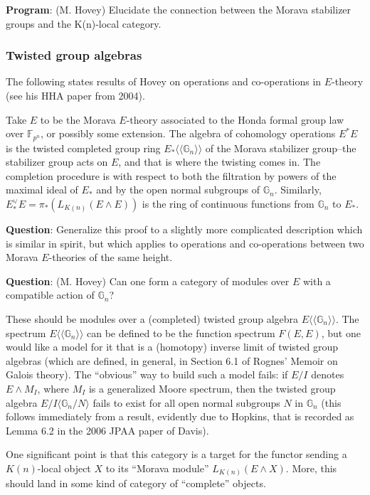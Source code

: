 \documentclass[12pt,titlepage]{article}
\theoremstyle{plain}
\theoremstyle{definition}
\theoremstyle{remark}
\begin{document}
\textbf{Program}: (M. Hovey) Elucidate the connection between the Morava stabilizer groups and the K(n)-local category.

\hypertarget{twisted_group_algebras_3}{}\subsubsection{{Twisted group algebras}}\label{twisted_group_algebras_3}

The following states results of Hovey on operations and co-operations in $E$-theory (see his HHA paper from 2004).

Take $E$ to be the Morava $E$-theory associated to the Honda formal group law over $\mathbb{F}_{p^n}$, or possibly some extension. The algebra of cohomology operations $E^*E$ is the twisted completed group ring $E_*\langle\!\langle \mathbb{G}_n\rangle\!\rangle$ of the Morava stabilizer group--{}the stabilizer group acts on $E$, and that is where the twisting comes in. The completion procedure is with respect to both the filtration by powers of the maximal ideal of $E_*$ and by the open normal subgroups of $\mathbb{G}_n$. Similarly, $E^\vee_*E = \pi_*(L_{K(n)} (E \wedge E))$ is the ring of continuous functions from $\mathbb{G}_n$ to $E_\ast$.

\textbf{Question}: Generalize this proof to a slightly more complicated description which is similar in spirit, but which applies to operations and co-operations between two Morava $E$-theories of the same height.

\textbf{Question}: (M. Hovey) Can one form a category of modules over $E$ with a compatible action of $\mathbb{G}_n$?

These should be modules over a (completed) twisted group algebra $E\langle\!\langle\mathbb{G}_n\rangle\!\rangle$. The spectrum $E\langle\!\langle\mathbb{G}_n\rangle\!\rangle$ can be defined to be the function spectrum $F(E, E)$, but one would like a model for it that is a (homotopy) inverse limit of twisted group algebras (which are defined, in general, in Section 6.1 of Rognes'{} Memoir on Galois theory). The ``{}obvious''{} way to build such a model fails: if $E/I$ denotes $E \wedge M_I$, where $M_I$ is a generalized Moore spectrum, then the twisted group algebra $E/I\langle\mathbb{G}_n/N\rangle$ fails to exist for all open normal subgroups $N$ in $\mathbb{G}_n$ (this follows immediately from a result, evidently due to Hopkins, that is recorded as Lemma 6.2 in the 2006 JPAA paper of Davis).

One significant point is that this category is a target for the functor sending a $K(n)$-local object $X$ to its ``{}Morava module''{} $L_{K(n)} (E \wedge X)$. More, this should land in some kind of category of ``{}complete''{} objects.
\end{document}
